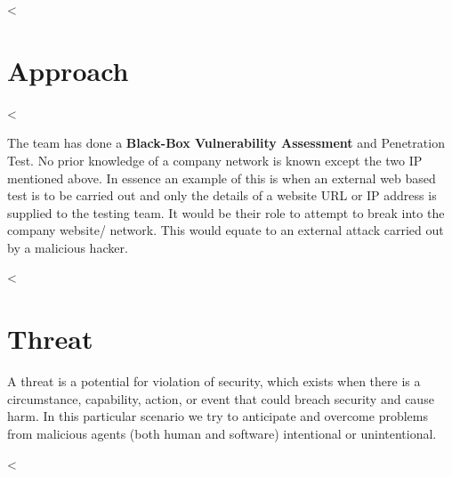   <%
  \section{Approach}\label{sec:approach}

  <%

  The team has done a \textbf{Black-Box Vulnerability Assessment} and
  Penetration Test. No prior knowledge of a company network is known except the
  two IP mentioned above. In essence an example of this is when an external web
  based test is to be carried out and only the details of a website URL or IP
  address is supplied to the testing team. It would be their role to attempt to
  break into the company website/ network. This would equate to an external
  attack carried out by a malicious hacker.

  <%
  \section{Threat}\label{sec:threat}

  A threat is a potential for violation of security, which exists when there is
  a circumstance, capability, action, or event that could breach security and
  cause harm. In this particular scenario we try to anticipate and overcome
  problems from malicious agents (both human and software) intentional or
  unintentional.


  <%
